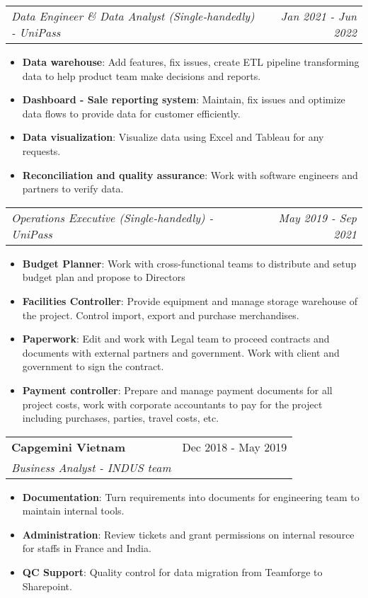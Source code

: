 \documentclass[letterpaper,11pt]{article}
\makeatletter
\newcommand{\resumeItem}[2]{
  \item\small{
    \textbf{#1}{: #2 \vspace{-2pt}}
  }
}
\newcommand{\resumeItemNornal}[1]{
  \item\small{
    {#1 \vspace{-2pt}}
  }
}
\newcommand{\resumeSubheading}[4]{
  \vspace{-1pt}
  \item
    \begin{tabular*}{0.97\textwidth}{l@{\extracolsep{\fill}}r}
      \textbf{#1} & #2 \\
      \textit{\small#3} & \textit{\small #4} \\
    \end{tabular*}\vspace{-5pt}
}
\newcommand{\resumeSubheadingNoTitle}[2]{
  \vspace{-1pt}
    \begin{tabular*}{0.97\textwidth}{l@{\extracolsep{\fill}}r}
      \textit{\small#1} & \textit{\small#2}
    \end{tabular*}\vspace{-5pt}
}
\newcommand{\resumeSubItemNormal}[1]{\resumeItemNornal{#1}\vspace{-4pt}}
\newcommand{\resumeItemListStart}{\begin{itemize}}
\newcommand{\resumeItemListEnd}{\end{itemize}\vspace{-5pt}}
\makeatother
\begin{document}
      \resumeSubheadingNoTitle
      {Data Engineer \& Data Analyst (Single-handedly) - UniPass}{Jan 2021 - Jun 2022}
      \resumeItemListStart
        \resumeItem{Data warehouse}
        {Add features, fix issues, create ETL pipeline transforming data to help product team make decisions and reports.}
        \resumeItem{Dashboard - Sale reporting system}
        {Maintain, fix issues and optimize data flows to provide data for customer efficiently.} 
        \resumeItem{Data visualization}
        {Visualize data using Excel and Tableau for any requests.}
        \resumeItem{Reconciliation and quality assurance}
        {Work with software engineers and partners to verify data.}
      \resumeItemListEnd
      \resumeSubheadingNoTitle
      {Operations Executive (Single-handedly) - UniPass}{May 2019 - Sep 2021}
      \resumeItemListStart
      
        \resumeItem{Budget Planner}
        {Work with cross-functional teams to distribute and setup budget plan and propose to Directors}
        \resumeItem{Facilities Controller}
          {Provide equipment and manage storage warehouse of the project. Control import, export and purchase merchandises.}
        \resumeItem{Paperwork}
          {Edit and work with Legal team to proceed contracts and documents with external partners and government. Work with client and government to sign the contract.}
         \resumeItem{Payment controller}
          {Prepare and manage payment documents for all project costs, work with corporate accountants to pay for the project including purchases, parties, travel costs, etc.}
      \resumeItemListEnd
      
    \resumeSubheading
      {Capgemini Vietnam}{Dec 2018 - May 2019}
      {Business Analyst - INDUS team}{}
      \resumeItemListStart
        \resumeItem{Documentation}
          {Turn requirements into documents for engineering team to maintain internal tools.} 
        \resumeItem{Administration}
            {Review tickets and grant permissions on internal resource for staffs in France and India.}
        \resumeItem{QC Support}    
            {Quality control for data migration from Teamforge to Sharepoint. }
      \resumeItemListEnd
\end{document}
